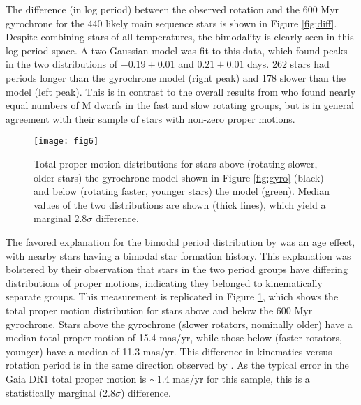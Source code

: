 \documentclass[manuscript, letterpaper]{aastex6}
\makeatletter
\let\origsection\section
\renewcommand\section{\@ifstar{\starsection}{\nostarsection}}
\newcommand\nostarsection[1]{\sectionprelude\origsection{#1}}
\newcommand\starsection[1]{\sectionprelude\origsection*{#1}}
\newcommand\sectionprelude{\vspace{1em}}
\makeatother
\begin{document}
The difference (in log period) between the observed rotation and the 600 Myr gyrochrone for the 440 likely main sequence stars is shown in Figure \ref{fig:diff}. Despite combining stars of all temperatures, the bimodality is clearly seen in this log period space. A two Gaussian model was fit to this data, which found peaks in the two distributions of $-0.19 \pm 0.01$ and $0.21 \pm 0.01$ days.  262 stars had periods longer than the gyrochrone model (right peak) and 178 slower than the model (left peak). This is in contrast to the overall results from \citet{mcquillan2013} who found nearly equal numbers of M dwarfs in the fast and slow rotating groups, but is in general agreement with their sample of stars with non-zero proper motions. 




\begin{figure}[]
\centering
\texttt{[image: fig6]}
\caption{Total proper motion distributions for stars above (rotating slower, older stars) the gyrochrone model shown in Figure \ref{fig:gyro} (black) and below (rotating faster, younger stars) the model (green). Median values of the two distributions are shown (thick lines), which yield a marginal 2.8$\sigma$ difference.
}
\label{fig:pm}
\end{figure}


The favored explanation for the bimodal period distribution by \citet{mcquillan2013} was an age effect, with nearby stars having a bimodal star formation history. This explanation was bolstered by their observation that stars in the two period groups have differing distributions of proper motions, indicating they belonged to kinematically separate groups. This measurement is replicated in Figure \ref{fig:pm}, which shows the total proper motion distribution for stars above and below the 600 Myr gyrochrone. Stars above the gyrochrone (slower rotators, nominally older) have a median total proper motion of 15.4 mas/yr, while those below (faster rotators, younger)  have a median of 11.3 mas/yr. This difference in kinematics versus rotation period is in the same direction observed by \citet{mcquillan2013}. As the typical error in the  Gaia DR1 total proper motion is $\sim$1.4 mas/yr for this sample, this is a statistically marginal (2.8$\sigma$) difference. 



\section{Discussion}
\end{document}
